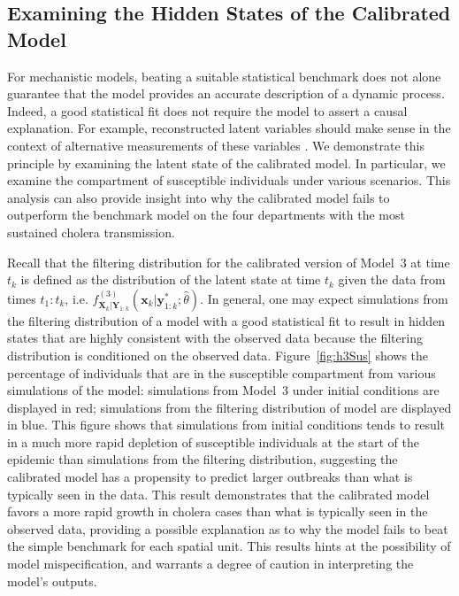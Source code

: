 \subsection{Examining the Hidden States of the Calibrated Model}

For mechanistic models, beating a suitable statistical benchmark does not alone guarantee that the model provides an accurate description of a dynamic process.
Indeed, a good statistical fit does not require the model to assert a causal explanation.
For example, reconstructed latent variables should make sense in the context of alternative measurements of these variables \cite{grad12}.
We demonstrate this principle by examining the latent state of the calibrated model.
In particular, we examine the compartment of susceptible individuals under various scenarios.
This analysis can also provide insight into why the calibrated model fails to outperform the benchmark model on the four departments with the most sustained cholera transmission.

Recall that the filtering distribution for the calibrated version of Model~3 at time $t_k$ is defined as the distribution of the latent state at time $t_k$ given the data from times $t_{1}:t_{k}$, i.e. $f^{(3)}_{\bm{X}_k|\bm{Y}_{1:k}}(\bm{x}_{k} | \bm{y}^*_{1:k} ; \hat\theta)$.
In general, one may expect simulations from the filtering distribution of a model with a good statistical fit to result in hidden states that are highly consistent with the observed data because the filtering distribution is conditioned on the observed data.
Figure~\ref{fig:h3Sus} shows the percentage of individuals that are in the susceptible compartment from various simulations of the model:
simulations from Model~3 under initial conditions are displayed in red; simulations from the filtering distribution of model are displayed in blue.
This figure shows that simulations from initial conditions tends to result in a much more rapid depletion of susceptible individuals at the start of the epidemic than simulations from the filtering distribution, suggesting the calibrated model has a propensity to predict larger outbreaks than what is typically seen in the data.
This result demonstrates that the calibrated model favors a more rapid growth in cholera cases than what is typically seen in the observed data, providing a possible explanation as to why the model fails to beat the simple benchmark for each spatial unit.
This results hints at the possibility of model mispecification, and warrants a degree of caution in interpreting the model's outputs.



